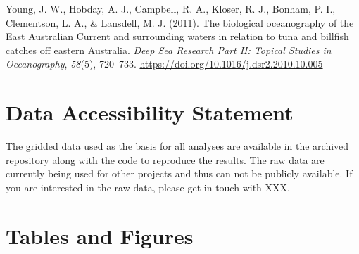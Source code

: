 \documentclass{article}
\newlength{\cslhangindent}
\newlength{\cslentryspacingunit} %
\newenvironment{CSLReferences}[2] %
 {%
  \setlength{\parindent}{0pt}
  \ifodd #1
  \let\oldpar\par
  \def\par{\hangindent=\cslhangindent\oldpar}
  \fi
  \setlength{\parskip}{#2\cslentryspacingunit}
 }%
 {}
\begin{document}
\begin{linenumbers}
\begin{CSLReferences}{1}{0}
\leavevmode{}%
Young, J. W., Hobday, A. J., Campbell, R. A., Kloser, R. J., Bonham, P. I., Clementson, L. A., \& Lansdell, M. J. (2011). The biological oceanography of the East Australian Current and surrounding waters in relation to tuna and billfish catches off eastern Australia. \emph{Deep Sea Research Part II: Topical Studies in Oceanography}, \emph{58}(5), 720--733. \url{https://doi.org/10.1016/j.dsr2.2010.10.005}

\end{CSLReferences}

\newpage

\hypertarget{data-accessibility-statement}{%
\section*{Data Accessibility Statement}\label{data-accessibility-statement}}

The gridded data used as the basis for all analyses are available in the archived repository along with the code to reproduce the results. The raw data are currently being used for other projects and thus can not be publicly available. If you are interested in the raw data, please get in touch with XXX.

\newpage

\hypertarget{tables-and-figures}{%
\section*{Tables and Figures}\label{tables-and-figures}}


\end{linenumbers}
\end{document}
